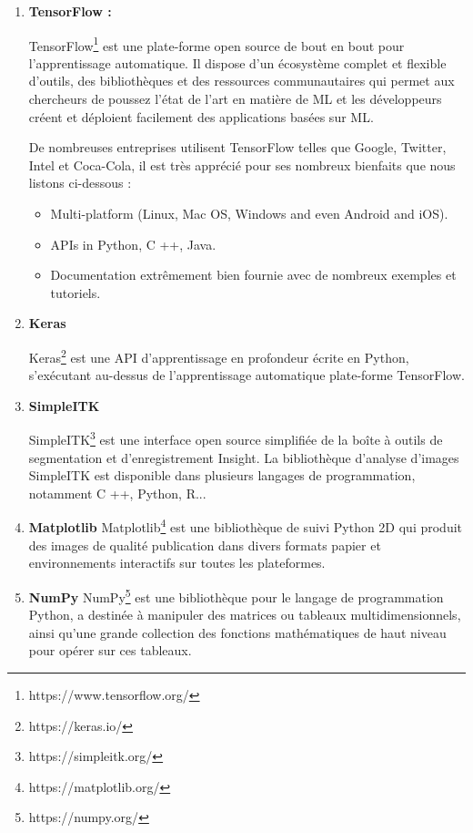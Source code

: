 \begin{enumerate}
    \item \textbf{TensorFlow :}

TensorFlow\footnote{https://www.tensorflow.org/} est une plate-forme open source de bout en bout pour l'apprentissage automatique. Il dispose d'un écosystème complet et flexible d'outils, des bibliothèques et des ressources communautaires qui permet aux chercheurs de poussez l'état de l'art en matière de ML et les développeurs créent et déploient facilement des applications basées sur ML.

De nombreuses entreprises utilisent TensorFlow telles que Google, Twitter, Intel et Coca-Cola, il est très apprécié pour ses nombreux bienfaits que nous listons ci-dessous :
\begin{itemize}

\item Multi-platform (Linux, Mac OS, Windows and even Android and iOS).

\item APIs in Python, C ++, Java.

\item Documentation extrêmement bien fournie avec de nombreux exemples et tutoriels.

\end{itemize}
\item \textbf{Keras}

Keras\footnote{https://keras.io/} est une API d'apprentissage en profondeur écrite en Python, s'exécutant au-dessus de l'apprentissage automatique plate-forme TensorFlow.
\item \textbf{SimpleITK} 

SimpleITK\footnote{https://simpleitk.org/} est une interface open source simplifiée de la boîte à outils de segmentation et d'enregistrement Insight. La bibliothèque d'analyse d'images SimpleITK est disponible dans plusieurs langages de programmation, notamment C ++, Python, R...

\item \textbf{Matplotlib}
Matplotlib\footnote{https://matplotlib.org/} est une bibliothèque de suivi Python 2D qui produit des images de qualité publication dans
divers formats papier et environnements interactifs sur toutes les plateformes.

\item \textbf{NumPy}
NumPy\footnote{https://numpy.org/} est une bibliothèque pour le langage de programmation Python, a destinée à manipuler des matrices ou tableaux multidimensionnels, ainsi qu'une grande collection des fonctions mathématiques de haut niveau pour opérer sur ces tableaux.


\end{enumerate}
